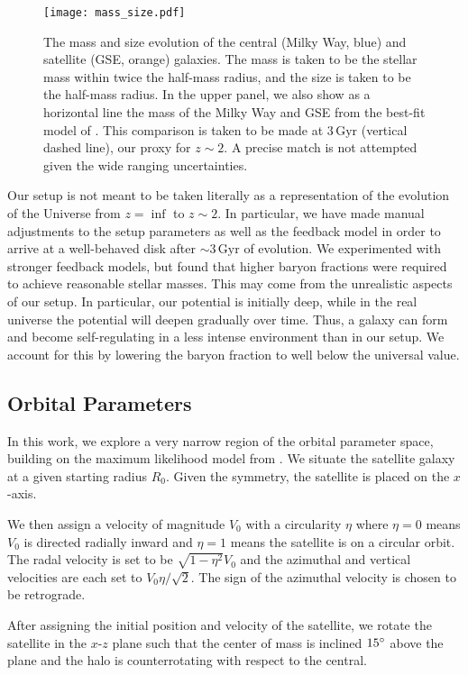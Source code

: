 \documentclass[linenumbers, twocolumn]{aastex631}
\newcommand{\Gyr}{\ensuremath{\textrm{Gyr}}}
\begin{document}
\begin{figure}
  \centering
  \texttt{[image: mass\_size.pdf]}
  \caption{The mass and size evolution of the central (Milky Way, blue) and satellite (GSE, orange) galaxies. The mass is taken to be the stellar mass within twice the half-mass radius, and the size is taken to be the half-mass radius. In the upper panel, we also show as a horizontal line the mass of the Milky Way and GSE from the best-fit model of \citet{2021ApJ...923...92N}. This comparison is taken to be made at $3\,\Gyr$ (vertical dashed line), our proxy for $z\sim2$. A precise match is not attempted given the wide ranging uncertainties.}
  \label{fig:mass_size}
\end{figure}

Our setup is not meant to be taken literally as a representation of the evolution of the Universe from $z=\inf$ to $z\sim2$. In particular, we have made manual adjustments to the setup parameters as well as the feedback model in order to arrive at a well-behaved disk after $\sim3\,\Gyr$ of evolution. We experimented with stronger feedback models, but found that higher baryon fractions were required to achieve reasonable stellar masses. This may come from the unrealistic aspects of our setup. In particular, our potential is initially deep, while in the real universe the potential will deepen gradually over time. Thus, a galaxy can form and become self-regulating in a less intense environment than in our setup. We account for this by lowering the baryon fraction to well below the universal value.

\subsection{Orbital Parameters}\label{ssec:orbits}
In this work, we explore a very narrow region of the orbital parameter space, building on the maximum likelihood model from \citet{2021ApJ...923...92N}. We situate the satellite galaxy at a given starting radius $R_0$. Given the symmetry, the satellite is placed on the $x$-axis. 

We then assign a velocity of magnitude $V_0$ with a circularity $\eta$ where $\eta=0$ means $V_0$ is directed radially inward and $\eta=1$ means the satellite is on a circular orbit. The radal velocity is set to be $\sqrt{1-\eta^2}V_0$ and the azimuthal and vertical velocities are each set to $V_0 \eta / \sqrt{2}$. The sign of the azimuthal velocity is chosen to be retrograde.

After assigning the initial position and velocity of the satellite, we rotate the satellite in the $x$-$z$ plane such that the center of mass is inclined $15\degree$ above the plane and the halo is counterrotating with respect to the central.
\end{document}
